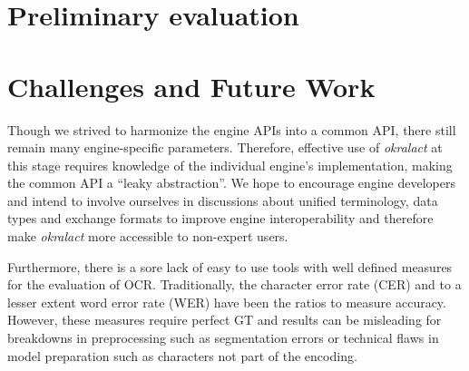 \documentclass[conference]{IEEEtran}
\begin{document}
\section{Preliminary evaluation}



\section*{Challenges and Future Work}



Though we strived to harmonize the engine APIs into a common API,
there still remain many engine-specific parameters. Therefore,
effective use of \textit{okralact} at this stage requires knowledge
of the individual engine's implementation, making the common API a
``leaky abstraction''. We hope to encourage engine developers and
intend to involve ourselves in discussions about unified
terminology, data types and exchange formats to improve engine
interoperability and therefore make \textit{okralact} more
accessible to non-expert users.


Furthermore, there is a sore lack of easy to use tools with well
defined measures for the evaluation of OCR. Traditionally, the
character error rate (CER) and to a lesser extent word error rate
(WER) have been the ratios to measure accuracy. However, these
measures require perfect GT and results can be misleading for
breakdowns in preprocessing such as segmentation errors or
technical flaws in model preparation such as characters not part
of the encoding.
\end{document}
